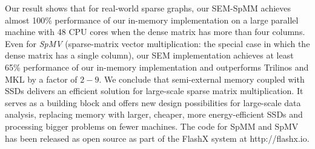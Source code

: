 Our result shows that for real-world sparse graphs, our SEM-SpMM achieves almost
100\% performance of our in-memory implementation on a large parallel machine
with 48 CPU cores when the dense matrix has more than four columns. Even for
{\em SpMV} (sparse-matrix vector multiplication: the special case in which the dense 
matrix has a single column), our SEM implementation achieves at least 65\% 
performance of our in-memory implementation and outperforms Trilinos \cite{trilinos} and MKL \cite{mkl} by
a factor of $2-9$. 
We conclude that semi-external memory coupled with SSDs delivers an efficient
solution for large-scale sparse matrix multiplication. It serves
as a building block and offers new design possibilities for large-scale
data analysis, replacing memory with larger, cheaper, more energy-efficient SSDs
and processing bigger problems on fewer machines. The code for SpMM and SpMV has been 
released as open source as part of the FlashX system at http://flashx.io.
